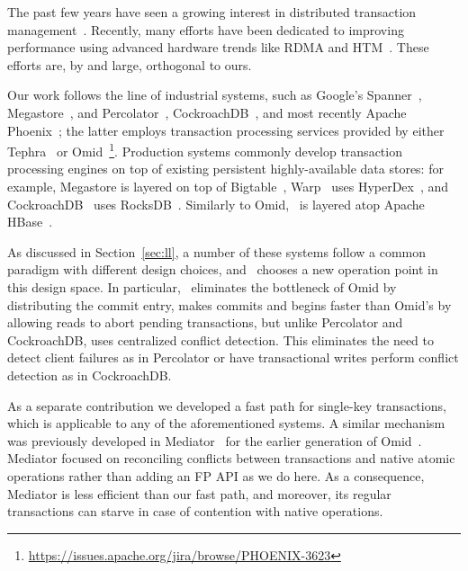 

The past few years have seen a growing interest in distributed 
transaction management~\cite{PattersonENAA12,Cowling2012,Aguilera2015,Balakrishnan2013,Thomson2012,eyal2013ordering,Warp}.
Recently, many efforts have been dedicated to improving performance using advanced 
hardware trends like RDMA and HTM~\cite{Wei2015,Dragojevic2014,Dragojevic2015}.  
These efforts are, by and large, orthogonal to ours.

Our work follows the line of industrial systems, such as 
Google's Spanner~\cite{Spanner2012}, Megastore~\cite{Megastore}, and Percolator~\cite{Percolator2010}, 
CockroachDB~\cite{cockroach}, and most recently Apache Phoenix~\cite{Phoenix}; 
the latter employs 
transaction processing services provided by either Tephra~\cite{tephra} or Omid~\cite{Omid2017}\footnote{\url{https://issues.apache.org/jira/browse/PHOENIX-3623}}. 
Production systems commonly develop transaction processing engines on top of existing persistent 
highly-available data stores: for example, Megastore is layered on top of
Bigtable~\cite{Chang2008}, Warp~\cite{Warp} uses HyperDex~\cite{Escriva2012}, 
and CockroachDB~\cite{cockroach} uses RocksDB~\cite{rocksdb}.
Similarly to Omid, \sys\ is layered atop Apache HBase~\cite{hbase}.

As discussed in Section~\ref{sec:ll}, a number of these systems follow a common paradigm
with different design choices, and \sys\ chooses a new operation point in 
this design space. In particular, \sys\ eliminates the bottleneck of Omid by
distributing the commit entry, makes commits and begins faster than Omid's by 
allowing reads to abort pending transactions, but unlike Percolator and CockroachDB, 
uses centralized conflict detection. This eliminates the need to detect client 
failures as in Percolator or have transactional writes perform conflict detection 
as in CockroachDB. 

As a separate contribution we developed a fast path for single-key transactions,
which is applicable to any of the aforementioned systems. A similar mechanism 
was previously developed in Mediator~\cite{mediator} for the earlier generation 
of Omid~\cite{OmidICDE2014}. Mediator focused on reconciling conflicts between 
transactions and native atomic operations rather than adding an FP API as we do here. 
As a consequence, Mediator is less efficient than our fast path, and moreover, 
its regular transactions can starve in case 
of contention with native operations. 

